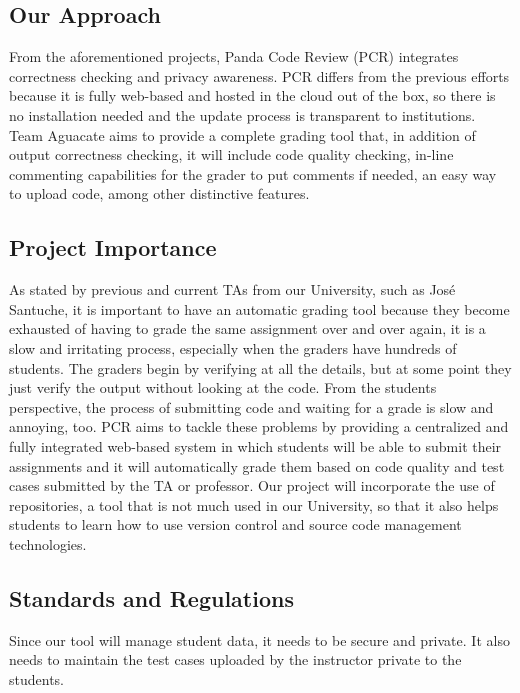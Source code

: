 \subsection{Our Approach}

From the aforementioned projects, Panda Code Review (PCR) integrates correctness
checking and privacy awareness. PCR differs from the previous efforts because it
is fully web-based and hosted in the cloud out of the box, so there is no
installation needed and the update process is transparent to institutions. Team
Aguacate aims to provide a complete grading tool that, in addition of output
correctness checking, it will include code quality checking, in-line commenting
capabilities for the grader to put comments if needed, an easy way to upload
code, among other distinctive features.

\subsection{Project Importance}

As stated by previous and current TAs from our University, such as José
Santuche, it is important to have an automatic grading tool because they become
exhausted of having to grade the same assignment over and over again, it is a
slow and irritating process, especially when the graders have hundreds of
students. The graders begin by verifying at all the details, but at some point
they just verify the output without looking at the code. From the students
perspective, the process of submitting code and waiting for a grade is slow and
annoying, too. PCR aims to tackle these problems by providing a centralized and
fully integrated web-based system in which students will be able to submit their
assignments and it will automatically grade them based on code quality and test
cases submitted by the TA or professor. Our project will incorporate the use of
repositories, a tool that is not much used in our University, so that it also
helps students to learn how to use version control and source code management
technologies.

\subsection{Standards and Regulations}

Since our tool will manage student data, it needs to be secure and private. It
also needs to maintain the test cases uploaded by the instructor private to the
students.

